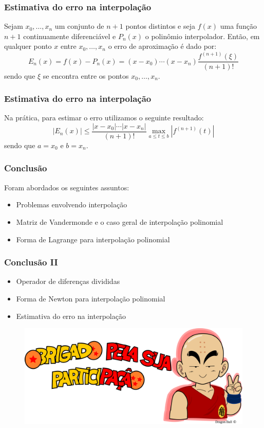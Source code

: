 \documentclass{beamer}
\theoremstyle{mystyle}
\begin{document}
\begin{frame}	
	\frametitle{Estimativa do erro na interpolação}
	Sejam $ x_{0},\ldots, x_{n} $ um conjunto de $ n + 1 $ pontos distintos e seja $ f(x) $ uma função $ n + 1 $ continuamente diferenciável e $ P_{n}(x) $ o polinômio interpolador. Então, em qualquer ponto $ x $ entre $ x_{0},\ldots, x_{n} $ o erro de aproximação é dado por:
	\begin{equation*}
		E_{n}(x) = f(x) - P_{n}(x)  = (x - x_{0})\cdots(x - x_{n})\dfrac{f^{(n+1)}(\xi)}{(n+1)!}
	\end{equation*}
	sendo que $ \xi $ se encontra entre os pontos $ x_{0},\ldots, x_{n} $.
\end{frame}

\begin{frame}	
	\frametitle{Estimativa do erro na interpolação}
	Na prática, para estimar o erro utilizamos o seguinte resultado:
	\begin{equation*}
		|E_{n}(x)| \leq \dfrac{|x - x_{0}|\cdots|x - x_{n}|}{(n+1)!}\max_{a\leq t\leq b} |f^{(n+1)}(t)|
	\end{equation*}
	sendo que $a = x_{0}$ e $ b = x_{n} $.
\end{frame}

\begin{frame}
	\frametitle{Conclusão}	
	Foram abordados os seguintes assuntos:
	\begin{itemize}
		\item Problemas envolvendo interpolação
		\item Matriz de Vandermonde e o caso geral de interpolação polinomial
		\item Forma de Lagrange para interpolação polinomial
	\end{itemize}
\end{frame}

\begin{frame}
	\frametitle{Conclusão II}	
	\begin{itemize}
		\item Operador de diferenças divididas
		\item Forma de Newton para interpolação polinomial
		\item Estimativa do erro na interpolação
	\end{itemize}
\end{frame}

\begin{frame}[plain]
\bigskip
\bigskip
\bigskip
\bigskip
\bigskip
\begin{figure}
	\centering
	\includegraphics[width=0.9\linewidth]{../krillin_v}
	\label{fig:luffyv}
\end{figure}
\end{frame}
\end{document}
